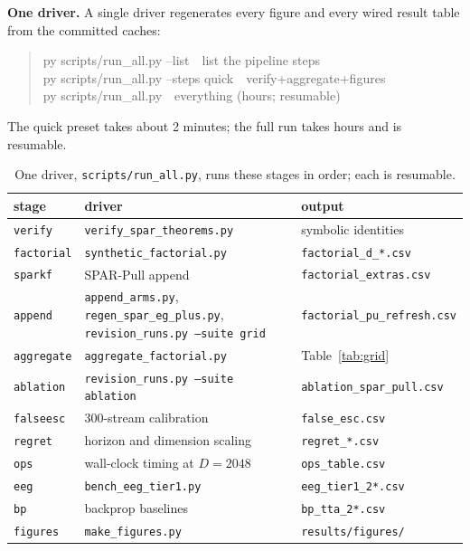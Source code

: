 \textbf{One driver.}
A single driver regenerates every figure and every wired result table from the committed caches:
\begin{quote}
\ttfamily
py scripts/run\_all.py --list\ \ list the pipeline steps\\
py scripts/run\_all.py --steps quick\ \ verify+aggregate+figures\\
py scripts/run\_all.py\ \ everything (hours; resumable)
\end{quote}
The quick preset takes about 2 minutes; the full run takes hours and is resumable.
\begin{table}[!htbp]
\centering
\footnotesize
\setlength{\tabcolsep}{4pt}
\caption{One driver, \texttt{scripts/run\_all.py}, runs these stages in order; each is resumable.}
\label{tab:pipeline}
\begin{tabular}{lll}
\toprule
stage & driver & output \\
\midrule
\texttt{verify} & \texttt{verify\_spar\_theorems.py} & symbolic identities \\
\texttt{factorial} & \texttt{synthetic\_factorial.py} & \texttt{factorial\_d\_*.csv} \\
\texttt{sparkf} & SPAR-Pull append & \texttt{factorial\_extras.csv} \\
\texttt{append} & \texttt{append\_arms.py}, \texttt{regen\_spar\_eg\_plus.py}, \texttt{revision\_runs.py --suite grid} & \texttt{factorial\_pu\_refresh.csv} \\
\texttt{aggregate} & \texttt{aggregate\_factorial.py} & Table~\ref{tab:grid} \\
\texttt{ablation} & \texttt{revision\_runs.py --suite ablation} & \texttt{ablation\_spar\_pull.csv} \\
\texttt{falseesc} & 300-stream calibration & \texttt{false\_esc.csv} \\
\texttt{regret} & horizon and dimension scaling & \texttt{regret\_*.csv} \\
\texttt{ops} & wall-clock timing at $D=2048$ & \texttt{ops\_table.csv} \\
\texttt{eeg} & \texttt{bench\_eeg\_tier1.py} & \texttt{eeg\_tier1\_2*.csv} \\
\texttt{bp} & backprop baselines & \texttt{bp\_tta\_2*.csv} \\
\texttt{figures} & \texttt{make\_figures.py} & \texttt{results/figures/} \\
\bottomrule
\end{tabular}
\end{table}


